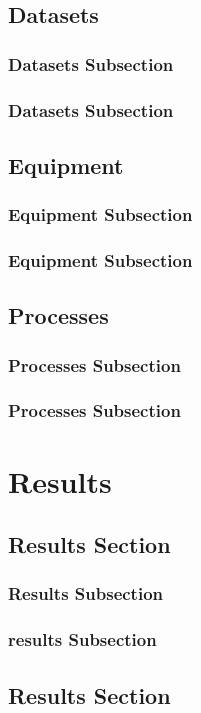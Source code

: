 \documentclass[oneside,14pt]{extarticle}
\begin{document}
		\subsection{Datasets}
			\subsubsection{Datasets Subsection}
			\subsubsection{Datasets Subsection}
		\subsection{Equipment}
			\subsubsection{Equipment Subsection}
			\subsubsection{Equipment Subsection}
		\subsection{Processes}
			\subsubsection{Processes Subsection}
			\subsubsection{Processes Subsection}
		\clearpage
	\section{Results} 
		\subsection{Results Section}
			\subsubsection{Results Subsection}
			\subsubsection{results Subsection}
		\subsection{Results Section}
\end{document}
